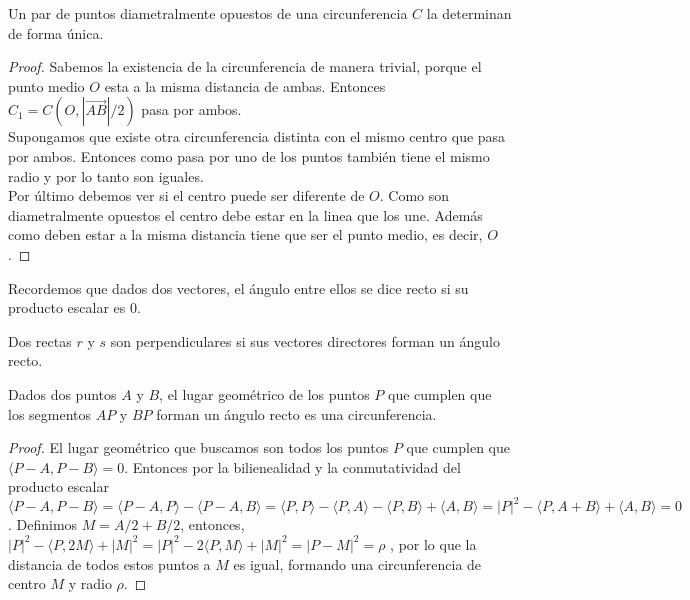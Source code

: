 \begin{nprop}
  Un par de puntos diametralmente opuestos de una circunferencia $C$ la determinan de forma única.
\end{nprop}
\begin{proof}
	Sabemos la existencia de la circunferencia de manera trivial, porque el punto medio $O$ esta a la misma distancia de ambas. Entonces $C_1 = C(O, |\vec{AB}|/2)$ pasa por ambos. \\
	Supongamos que existe otra circunferencia  distinta con el mismo centro que pasa por ambos. Entonces como pasa por uno de los puntos también tiene el mismo radio y por lo tanto son iguales.\\
	Por último debemos ver si el centro puede ser diferente de $O$. Como son diametralmente opuestos el centro debe estar en la linea que los une. Además como deben estar a la misma distancia tiene que ser el punto medio, es decir, $O$.
\end{proof}

\begin{nota} Recordemos que dados dos vectores, el ángulo entre ellos se dice recto si su producto escalar es 0.
\end{nota}

\begin{ndef}
  Dos rectas $r$ y $s$ son perpendiculares si sus vectores directores forman un ángulo recto.
\end{ndef}

\begin{nprop}
  Dados dos puntos $A$ y $B$, el lugar geométrico de los puntos $P$ que cumplen que los segmentos $AP$ y $BP$ forman un ángulo recto es una circunferencia.
\end{nprop}

\begin{proof}
	El lugar geométrico que buscamos son todos los puntos $P$ que cumplen que $\langle P-A, P-B\rangle =0$. Entonces por la bilienealidad y la conmutatividad del producto escalar $\langle P-A,P-B\rangle  = \langle P-A,P\rangle  - \langle  P-A,B\rangle  = \langle P,P\rangle  - \langle P,A\rangle  - \langle P,B\rangle  + \langle A,B\rangle  = | P|^2 - \langle P,A+B\rangle  + \langle A,B\rangle  = 0  $. Definimos $M=A/2+B/2 $, entonces, $|P|^2 - \langle P,2M\rangle  + |M|^2 = |P|^2 - 2\langle P,M\rangle  + |M|^2 = |P-M|^2 = \rho$ ,  por lo que la distancia de todos estos puntos a $M$ es igual, formando una circunferencia de centro $M$ y radio $\rho$.
\end{proof}

